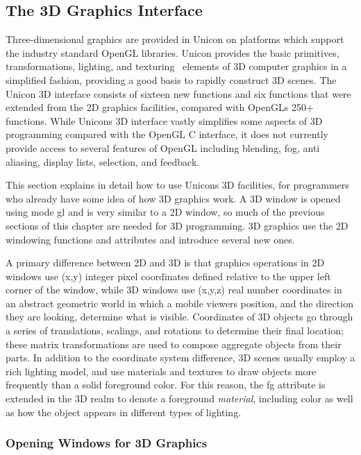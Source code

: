 \subsection{The 3D Graphics Interface}

Three-dimensional graphics are provided in Unicon on platforms which
support the industry standard OpenGL libraries. Unicon provides the
basic primitives, transformations, lighting, and texturing \ elements
of 3D computer graphics in a simplified fashion, providing a good basis
to rapidly construct 3D scenes. The Unicon 3D interface consists of
sixteen new functions and six functions that were extended from the 2D
graphics facilities, compared with OpenGL{\textquotesingle}s 250+
functions. While Unicon{\textquotesingle}s 3D interface vastly
simplifies some aspects of 3D programming compared with the OpenGL C
interface, it does not currently provide access to several features of
OpenGL including blending, fog, anti aliasing, display lists,
selection, and feedback.

This section explains in detail how to use Unicon{\textquotesingle}s 3D
facilities, for programmers who already have some idea of how 3D
graphics work. A 3D window is opened using mode
{\textquotedbl}gl{\textquotedbl} and is very similar to a 2D window, so
much of the previous sections of this chapter are needed for 3D
programming. 3D graphics use the 2D windowing functions and attributes
and introduce several new ones.

A primary difference between 2D and 3D is that graphics operations in 2D
windows use (x,y) integer pixel coordinates defined relative to the
upper left corner of the window, while 3D windows use (x,y,z) real
number coordinates in an abstract geometric world in which a mobile
viewer{\textquotesingle}s position, and the direction they are looking,
determine what is visible. Coordinates of 3D objects go through a
series of translations, scalings, and rotations to determine their
final location; these matrix transformations are used to compose
aggregate objects from their parts. In addition to the coordinate
system difference, 3D scenes usually employ a rich lighting model, and
use materials and textures to draw objects more frequently than a solid
foreground color. For this reason, the fg attribute is extended in the
3D realm to denote a foreground \textit{material}, including color as
well as how the object appears in different types of lighting.

\subsubsection{Opening Windows for 3D Graphics}

